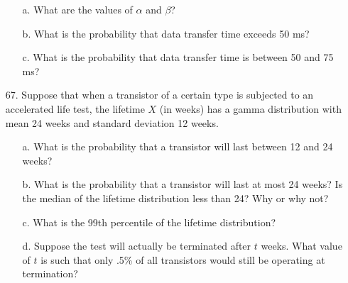 \documentclass[letterpaper,12pt]{article}
\begin{document}
\begin{enumerate}
\begin{enumerate}
      \item[a.]
        What are the values of $\alpha$ and $\beta$?
      \item[b.]
        What is the probability that data transfer time exceeds 50 ms?
      \item[c.]
        What is the probability that data transfer time is between 50 and 75 ms?
    \end{enumerate}
  \item[67.]
    Suppose that when a transistor of a certain type is subjected to an accelerated life test, the lifetime $X$ (in weeks) has a gamma distribution with mean 24 weeks and standard deviation 12 weeks.
    \begin{enumerate}
      \item[a.]
        What is the probability that a transistor will last between 12 and 24 weeks?
      \item[b.]
        What is the probability that a transistor will last at most 24 weeks? Is the median of the lifetime distribution less than 24? Why or why not?
      \item[c.]
        What is the 99th percentile of the lifetime distribution?
      \item[d.]
        Suppose the test will actually be terminated after $t$ weeks. What value of $t$ is such that only .5\% of all transistors would still be operating at termination?
    \end{enumerate}
\end{enumerate}
\end{document}

